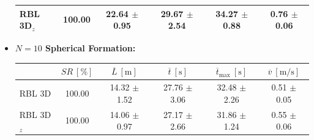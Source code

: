 \begin{itemize}
\begin{table}[H]
\begin{tabular}{|l|c|c|c|c|c|}
                    RBL 3D\(_z\)                & 100.00          & 22.64 $\pm$ 0.95                  & 29.67 $\pm$ 2.54                  & 34.27 $\pm$ 0.88                               & 0.76 $\pm$ 0.06                         \\ \hline
                    \end{tabular}
                \end{table}
            \item \textbf{$N = 10$ Spherical Formation:}
                \begin{table}[H]
                    \centering
                    \renewcommand{\arraystretch}{1.2}
                    \begin{tabular}{|l|c|c|c|c|c|}
                    \hline
                                                & \( SR \ [\%] \) & \( \overline{L} \ [\mathrm{m}] \) & \( \overline{t} \ [\mathrm{s}] \) & \( \overline{t}_{\text{max}} \ [\mathrm{s}] \) & \( \overline{v} \ [\mathrm{m/s}] \)     \\ \hline
                    RBL 3D                      & 100.00          & 14.32 $\pm$ 1.52                  & 27.76 $\pm$ 3.06                  & 32.48 $\pm$ 2.26                               & 0.51 $\pm$ 0.05                         \\ \hline
                    RBL 3D\(_z\)                & 100.00          & 14.06 $\pm$ 0.97                  & 27.17 $\pm$ 2.66                  & 31.86 $\pm$ 1.24                               & 0.55 $\pm$ 0.06                         \\ \hline
                    \end{tabular}
                \end{table}
        \end{itemize}

